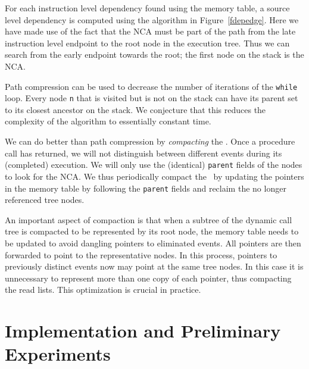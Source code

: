 \documentclass{acm_proc_article-sp}
\begin{document}
For each instruction level dependency found using the memory table,
a source level dependency is computed using the algorithm in 
Figure~\ref{fdepedge}. Here we
have made use of the fact that the NCA must be part of the path from the
late instruction level endpoint to the root node in the execution tree. 
Thus
we can search from the early endpoint towards the root; the first node
on the stack is the NCA.

Path compression can be used to decrease the number of iterations of the 
{\tt while} loop.
Every node {\tt n} that is visited but is not on the stack can have its parent set
to its closest ancestor on the stack. We conjecture that this reduces the 
complexity of the algorithm to essentially constant time. 


We can do better than path compression by {\em compacting} the \tracepile. 
Once a procedure call has returned, we will not distinguish between 
different events during its (completed) execution. We will only use the
(identical) {\tt parent} fields of the nodes to look for the NCA. We 
thus periodically compact the \tracepile\ by updating the pointers in 
the memory table by following the {\tt parent} fields and reclaim the no longer
referenced tree nodes.




An important aspect of compaction is that when a subtree of the dynamic
call tree is compacted to be represented by its root node, the memory table
needs to be updated to avoid dangling pointers to eliminated events. All
pointers are then forwarded to point to the representative nodes. In this
process, pointers to previously distinct events now may point at the same 
tree nodes. In this case it is unnecessary to represent more than one 
copy of each pointer, thus compacting the read lists. This optimization is 
crucial in practice.




\section{Implementation and Preliminary Experiments}
\end{document}

